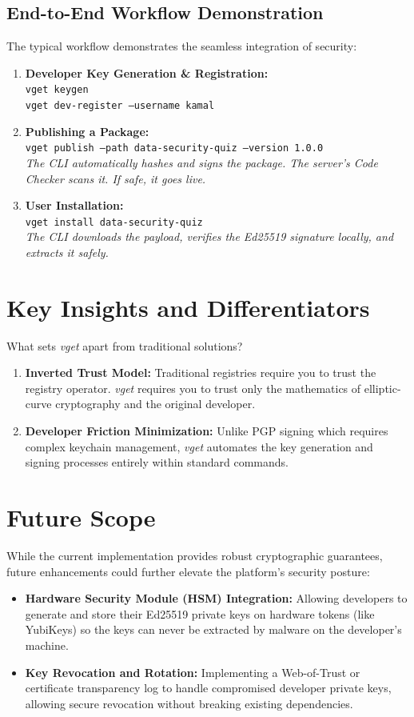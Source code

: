 \documentclass[conference]{IEEEtran}
\begin{document}
\subsection{End-to-End Workflow Demonstration}
The typical workflow demonstrates the seamless integration of security:
\begin{enumerate}
    \item \textbf{Developer Key Generation \& Registration:} \\
    \texttt{vget keygen} \\
    \texttt{vget dev-register --username kamal}
    \item \textbf{Publishing a Package:} \\
    \texttt{vget publish --path data-security-quiz --version 1.0.0} \\
    \textit{The CLI automatically hashes and signs the package. The server's Code Checker scans it. If safe, it goes live.}
    \item \textbf{User Installation:} \\
    \texttt{vget install data-security-quiz} \\
    \textit{The CLI downloads the payload, verifies the Ed25519 signature locally, and extracts it safely.}
\end{enumerate}

\section{Key Insights and Differentiators}
What sets \textit{vget} apart from traditional solutions?
\begin{enumerate}
    \item \textbf{Inverted Trust Model:} Traditional registries require you to trust the registry operator. \textit{vget} requires you to trust only the mathematics of elliptic-curve cryptography and the original developer.
    \item \textbf{Developer Friction Minimization:} Unlike PGP signing which requires complex keychain management, \textit{vget} automates the key generation and signing processes entirely within standard commands.
\end{enumerate}

\section{Future Scope}
While the current implementation provides robust cryptographic guarantees, future enhancements could further elevate the platform's security posture:
\begin{itemize}
    \item \textbf{Hardware Security Module (HSM) Integration:} Allowing developers to generate and store their Ed25519 private keys on hardware tokens (like YubiKeys) so the keys can never be extracted by malware on the developer's machine.
    \item \textbf{Key Revocation and Rotation:} Implementing a Web-of-Trust or certificate transparency log to handle compromised developer private keys, allowing secure revocation without breaking existing dependencies.
\end{itemize}
\end{document}
